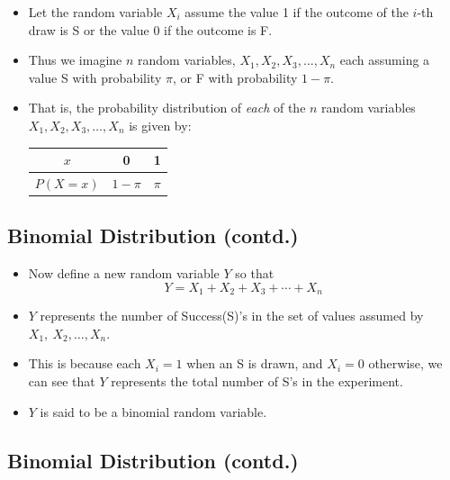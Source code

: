 \documentclass[
  letterpaper,
  DIV=11,
  numbers=noendperiod]{scrartcl}
\begin{document}
\begin{itemize}
\item
  Let the random variable \(X_i\) assume the value 1 if the outcome of
  the \(i\)-th draw is {S} or the value 0 if the outcome is {F}.\\
\item
  Thus we imagine \(n\) random variables, \(X_1, X_2, X_3, \ldots, X_n\)
  each assuming a value {S} with probability \(\pi\), or {F} with
  probability \(1 - \pi\).\\
\item
  That is, the probability distribution of \emph{each} of the \(n\)
  random variables \(X_1, X_2, X_3, \ldots, X_n\) is given by:\\

  \begin{longtable}[]{@{}ccc@{}}
  \toprule\noalign{}
  \(x\) & 0 & 1 \\
  \midrule\noalign{}
  \endhead
  \bottomrule\noalign{}
  \endlastfoot
  \(P(X=x)\) & \(1-\pi\) & \(\pi\) \\
  \end{longtable}
\end{itemize}

\subsection{Binomial Distribution
(contd.)}\label{binomial-distribution-contd.}

\begin{itemize}
\item
  Now define a new random variable \(Y\) so that
  \[Y = X_1 + X_2 + X_3 + \cdots + X_n \,\]
\item
  \(Y\) represents the number of {Success(S)}'s in the set of values
  assumed by \(X_1,\ X_2, \ldots,X_n\).\\
\item
  This is because each \(X_i=1\) when an {S} is drawn, and \(X_i=0\)
  otherwise, we can see that \(Y\) represents the total number of {S}'s
  in the experiment.\\
\item
  \(Y\) is said to be a {binomial random variable}.
\end{itemize}

\subsection{Binomial Distribution
(contd.)}\label{binomial-distribution-contd.-1}
\end{document}
